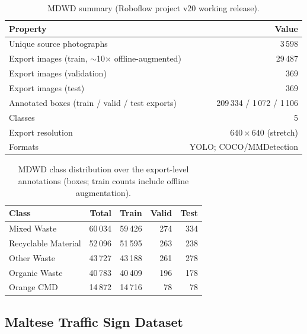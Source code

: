 \begin{table}[htbp]
\centering
\caption{MDWD summary (Roboflow project v20 working release).}
\label{tab:mdwd-summary}
\small
\begin{tabular}{lr}
\hline
\textbf{Property} & \textbf{Value} \\
\hline
Unique source photographs & 3\,598 \\
Export images (train, $\sim$10$\times$ offline-augmented) & 29\,487 \\
Export images (validation) & 369 \\
Export images (test) & 369 \\
Annotated boxes (train / valid / test exports) & 209\,334 / 1\,072 / 1\,106 \\
Classes & 5 \\
Export resolution & $640 \times 640$ (stretch) \\
Formats & YOLO; COCO/MMDetection \\
\hline
\end{tabular}
\end{table}

\begin{table}[htbp]
\centering
\caption{MDWD class distribution over the export-level annotations (boxes; train counts include offline augmentation).}
\label{tab:mdwd-classes}
\small
\begin{tabular}{lrrrr}
\hline
\textbf{Class} & \textbf{Total} & \textbf{Train} & \textbf{Valid} & \textbf{Test} \\
\hline
Mixed Waste & 60\,034 & 59\,426 & 274 & 334 \\
Recyclable Material & 52\,096 & 51\,595 & 263 & 238 \\
Other Waste & 43\,727 & 43\,188 & 261 & 278 \\
Organic Waste & 40\,783 & 40\,409 & 196 & 178 \\
Orange CMD & 14\,872 & 14\,716 & 78 & 78 \\
\hline
\end{tabular}
\end{table}

\subsection{Maltese Traffic Sign Dataset}
\label{subsec:mtsd-methodology}

